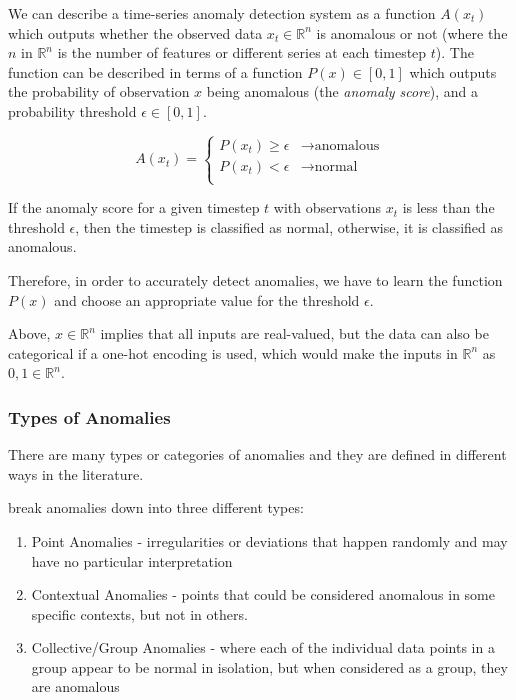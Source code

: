 \documentclass{mpaper}
\def\realnumbers{\mathbb{R}}
\begin{document}
We can describe a time-series anomaly detection system as a function $A(x_t)$ which outputs whether the observed data $x_t \in \realnumbers^{n}$ is anomalous or not (where the $n$ in $\realnumbers^{n}$ is the number of features or different series at each timestep $t$). The function can be described in terms of a function $P(x) \in [0,1]$ which outputs the probability of observation $x$ being anomalous (the \textit{anomaly score}), and a probability threshold $\epsilon \in [0, 1]$.

$$
A(x_t) = \begin{cases}
	P(x_t) \geq \epsilon & \rightarrow \text{anomalous}\\
	P(x_t) < \epsilon & \rightarrow \text{normal}\\
\end{cases}
$$

If the anomaly score for a given timestep $t$ with observations $x_t$ is less than the threshold $\epsilon$, then the timestep is classified as normal, otherwise, it is classified as anomalous.

Therefore, in order to accurately detect anomalies, we have to learn the function $P(x)$ and choose an appropriate value for the threshold $\epsilon$.

Above, $x \in \realnumbers^{n}$ implies that all inputs are real-valued, but the data can also be categorical if a one-hot encoding is used, which would make the inputs in $\realnumbers^{n}$ as $0,1 \in \realnumbers^{n}$.

\subsubsection{Types of Anomalies}
\label{section:types-of-anomalies}

There are many types or categories of anomalies and they are defined in different ways in the literature.

\cite{deepLearningSurvey} break anomalies down into three different types:
\begin{enumerate}
	\item Point Anomalies - irregularities or deviations that happen randomly and may have no particular interpretation
	\item Contextual Anomalies - points that could be considered anomalous in some specific contexts, but not in others.
	\item Collective/Group Anomalies - where each of the individual data points in a group appear to be normal in isolation, but when considered as a group, they are anomalous
\end{enumerate}
\end{document}
